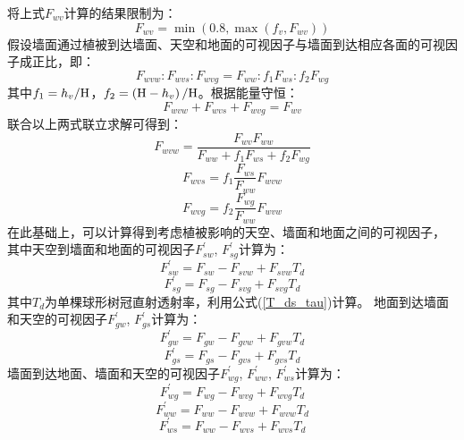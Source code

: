 将上式$F_{wv}$计算的结果限制为：
\begin{equation}
F_{wv} = \min (0.8, \max (f_v, F_{wv}))
\end{equation}
假设墙面通过植被到达墙面、天空和地面的可视因子与墙面到达相应各面的可视因子成正比，即：
\begin{equation}
F_{wvw}: F_{wvs}: F_{wvg}=F_{ww}: f_{1} F_{ws}: f_{2} F_{w g}
\end{equation}
其中$f_1=h_v/{\rm H}$，$f_2=\left({\rm H}-h_v\right)/{\rm H}$。根据能量守恒：
\begin{equation}
F_{wvw}+F_{wvs}+F_{wvg}=F_{w v}
\end{equation}
联合以上两式联立求解可得到：
\begin{equation}
F_{wvw}=\frac{F_{w v} F_{ww}}{F_{ww}+f_{1} F_{ws}+f_{2} F_{w g}}
\end{equation}
\begin{equation}
F_{wvs}=f_{1} \frac{F_{ws}}{F_{ww}} F_{wvw}
\end{equation}
\begin{equation}
F_{wvg}=f_{2} \frac{F_{w g}}{F_{ww}} F_{wvw}
\end{equation}
在此基础上，可以计算得到考虑植被影响的天空、墙面和地面之间的可视因子，
其中天空到墙面和地面的可视因子$F_{sw}^\prime$, $F_{sg}^\prime$计算为：
\begin{equation}
F_{sw}^{\prime}=F_{sw}-F_{svw}+F_{svw} T_{d}
\end{equation}
\begin{equation}
F_{sg}^{\prime}=F_{sg}-F_{svg}+F_{svg} T_{d}
\end{equation}
其中$T_d$为单棵球形树冠直射透射率，利用公式(\ref{T_ds_tau})计算。
地面到达墙面和天空的可视因子$F_{gw}^\prime$, $F_{gs}^\prime$计算为：
\begin{equation}
F_{gw}^{\prime}=F_{gw}-F_{gvw}+F_{gvw} T_{d}
\end{equation}
\begin{equation}
F_{gs}^{\prime}=F_{gs}-F_{gvs}+F_{gvs} T_{d}
\end{equation}
墙面到达地面、墙面和天空的可视因子$F_{wg}^\prime$, $F_{ww}^\prime$, $F_{ws}^\prime$计算为：
\begin{equation}
F_{wg}^{\prime}=F_{wg}-F_{wvg}+F_{wvg} T_{d}
\end{equation}
\begin{equation}
F_{ww}^{\prime}=F_{ww}-F_{wvw}+F_{wvw} T_{d}
\end{equation}
\begin{equation}
F_{ws}^{\prime}=F_{ww}-F_{wvs}+F_{wvs} T_{d}
\end{equation}

